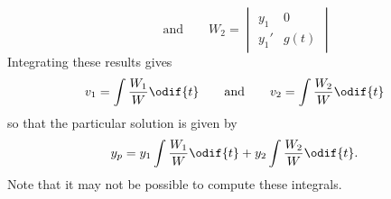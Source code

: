 \documentclass{article}
\begin{document}
\begin{appendix}
\begin{equation*}
        \qquad \text{and} \qquad
        W_2 = \begin{vmatrix}
            y_1  & 0                 \\
            y_1' & g\left( t \right)
        \end{vmatrix}
    \end{equation*}
    Integrating these results gives
    \begin{equation*}
        v_1 = \int \frac{W_1}{W} \odif{t} \qquad \text{and} \qquad v_2 = \int \frac{W_2}{W} \odif{t}
    \end{equation*}
    so that the particular solution is given by
    \begin{equation*}
        y_p = y_1 \int \frac{W_1}{W} \odif{t} + y_2 \int \frac{W_2}{W} \odif{t}.
    \end{equation*}
    Note that it may not be possible to compute these integrals.
\end{appendix}
\end{document}
